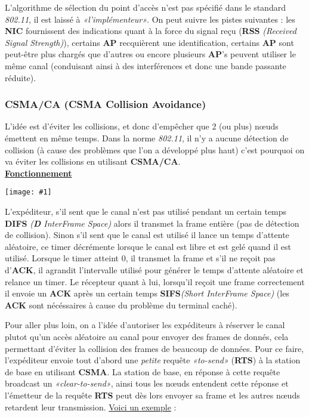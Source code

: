 \documentclass{article}
\newcommand{\imgR}[2]{\begin{center}\texttt{[image: \#1]}\end{center}}
\newcommand{\stitre}[1]{\noindent\textbf{\underline{#1}} \\}
\newcommand{\neuSPs}{n\oe uds }
\begin{document}
L'algorithme de sélection du point d'accès n'est pas spécifié dans le standard \textit{802.11}, il est laissé à 
\textit{«l'implémenteur»}. On peut suivre les pistes suivantes : les \textbf{NIC} fournissent des indications 
quant à la force du signal reçu (\textbf{RSS} \textit{(Received Signal Strength)}), certains \textbf{AP} 
recquièrent une identification, certains \textbf{AP} sont peut-être plus chargés que d'autres ou encore plusieurs 
\textbf{AP}'s peuvent utiliser le même canal (conduisant ainsi à des interférences et donc une bande passante 
réduite).

\subsubsection{CSMA/CA (CSMA Collision Avoidance)}

L'idée est d'éviter les collisions, et donc d'empêcher que 2 (ou plus) \neuSPs émettent en même temps. Dans la 
norme \textit{802.11}, il n'y a aucune détection de collision (à cause des problèmes que l'on a développé plus 
haut) c'est pourquoi on va éviter les collisions en utilisant \textbf{CSMA/CA}. \\

\stitre{Fonctionnement}

\begin{multicols}{2}
\imgR{CN_153.png}{160}
\noindent L'expéditeur, s'il sent que le canal n'est pas utilisé pendant un certain temps \textbf{DIFS} 
\textit{(\textbf{D} InterFrame Space)} alors il transmet la frame entière (pas de détection de collision). Sinon 
s'il sent que le canal est utilisé il lance un temps d'attente aléatoire, ce timer décrémente lorsque le canal 
est libre et est gelé quand il est utilisé. Lorsque le timer atteint $0$, il transmet la frame et s'il ne reçoit 
pas d'\textbf{ACK}, il agrandit l'intervalle utilisé pour générer le temps d'attente aléatoire et relance un 
timer. Le récepteur quant à lui, lorsqu'il reçoit une frame correctement il envoie un \textbf{ACK} après un 
certain temps \textbf{SIFS}\textit{(Short InterFrame Space)} (les \textbf{ACK} sont nécéssaires à cause du 
problème du terminal caché).
\end{multicols}

Pour aller plus loin, on a l'idée d'autoriser les expéditeurs à réserver le canal plutot qu'un accès aléatoire au 
canal pour envoyer des frames de donnés, cela permettant d'éviter la collision des frames de beaucoup de données.
Pour ce faire, l'expéditeur envoie tout d'abord une \textit{petite} requête \textit{«to-send»} (\textbf{RTS}) à 
la station de base en utilisant \textbf{CSMA}. La station de base, en réponse à cette requête broadcast un 
\textit{«clear-to-send»}, ainsi tous les \neuSPs entendent cette réponse et l'émetteur de la requête \textbf{RTS} 
peut dès lors envoyer sa frame et les autres \neuSPs retardent leur transmission. \underline{Voici un exemple} : 
\end{document}
